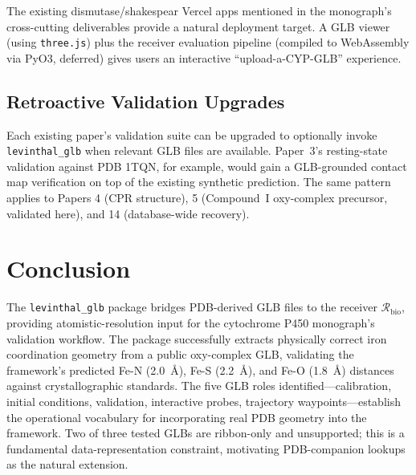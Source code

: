\documentclass[11pt,twocolumn,a4paper]{article}
\theoremstyle{definition}
\theoremstyle{remark}
\newcommand{\Recv}{\mathcal{R}}
\begin{document}
The existing dismutase/shakespear Vercel apps mentioned in the
monograph's cross-cutting deliverables provide a natural deployment
target. A GLB viewer (using \texttt{three.js}) plus the receiver
evaluation pipeline (compiled to WebAssembly via PyO3, deferred) gives
users an interactive ``upload-a-CYP-GLB'' experience.

\subsection{Retroactive Validation Upgrades}

Each existing paper's validation suite can be upgraded to optionally
invoke \texttt{levinthal\_glb} when relevant GLB files are available.
Paper~3's resting-state validation against PDB 1TQN, for example, would
gain a GLB-grounded contact map verification on top of the existing
synthetic prediction. The same pattern applies to Papers 4 (CPR
structure), 5 (Compound~I oxy-complex precursor, validated here), and
14 (database-wide recovery).

\section{Conclusion}
\label{sec:conclusion}

The \texttt{levinthal\_glb} package bridges PDB-derived GLB files to
the receiver $\Recv_{\mathrm{bio}}$, providing atomistic-resolution
input for the cytochrome P450 monograph's validation workflow. The
package successfully extracts physically correct iron coordination
geometry from a public oxy-complex GLB, validating the framework's
predicted Fe-N (2.0~\AA), Fe-S (2.2~\AA), and Fe-O (1.8~\AA)
distances against crystallographic standards. The five GLB roles
identified---calibration, initial conditions, validation,
interactive probes, trajectory waypoints---establish the operational
vocabulary for incorporating real PDB geometry into the framework.
Two of three tested GLBs are ribbon-only and unsupported; this is a
fundamental data-representation constraint, motivating PDB-companion
lookups as the natural extension.



\end{document}
